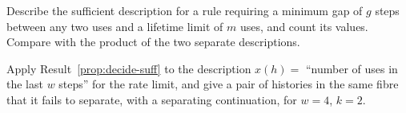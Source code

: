 \begin{exercise}
Describe the sufficient description for a rule requiring a minimum gap of $g$ steps between any two uses and a lifetime limit of $m$ uses, and count its values. Compare with the product of the two separate descriptions.
\end{exercise}

\begin{exercise}
Apply Result~\ref{prop:decide-suff} to the description $x(h)=$ ``number of uses in the last $w$ steps'' for the rate limit, and give a pair of histories in the same fibre that it fails to separate, with a separating continuation, for $w=4$, $k=2$.\label{ex2:window-count}
\end{exercise}

